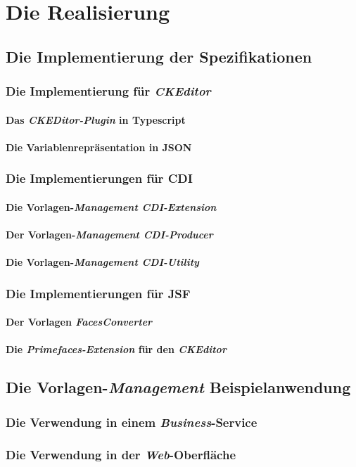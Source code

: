 \chapter{Die Realisierung}
\label{cha:Realisierung}
\section{Die Implementierung der Spezifikationen}

\subsection{Die Implementierung für \emph{CKEditor}}

\subsubsection{Das \emph{CKEDitor-Plugin} in Typescript}

\subsubsection{Die Variablenrepräsentation in JSON}


\subsection{Die Implementierungen für CDI}

\subsubsection{Die Vorlagen-\emph{Management CDI-Extension}}

\subsubsection{Der Vorlagen-\emph{Management CDI-Producer}}

\subsubsection{Die Vorlagen-\emph{Management CDI-Utility}}


\subsection{Die Implementierungen für JSF}

\subsubsection{Der Vorlagen \emph{FacesConverter}}

\subsubsection{Die \emph{Primefaces-Extension} für den \emph{CKEditor}}


\section{Die Vorlagen-\emph{Management} Beispielanwendung}
\subsection{Die Verwendung in einem \emph{Business}-Service}
\subsection{Die Verwendung in der \emph{Web}-Oberfläche}